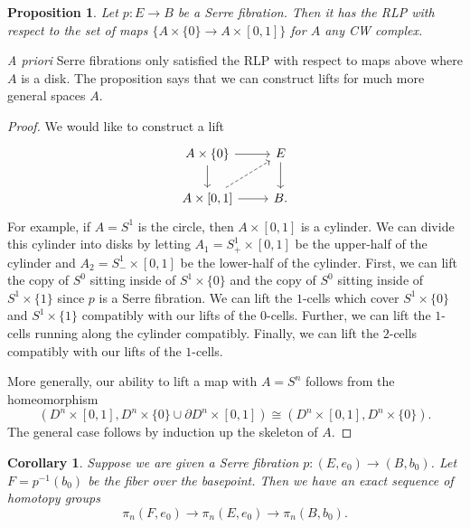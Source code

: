\documentclass{article}
\newtheorem{proposition}[theorem]{Proposition}
\newtheorem{corollary}[theorem]{Corollary}
\newtheorem{proposed work}[theorem]{Proposed Work}
\begin{document}
\begin{proposition}
Let $p : E \to B$ be a Serre fibration. Then it has the RLP with respect to the set of maps $\{A \times \{0\} \to A \times [0,1]\}$ for $A$ any CW complex. 
\end{proposition}

\emph{A priori} Serre fibrations only satisfied the RLP with respect to maps above where $A$ is a disk. The proposition says that we can construct lifts for much more general spaces $A$. 

\begin{proof}
We would like to construct a lift
\[
\begin{tikzcd}
A \times \{0 \} \arrow[r] \arrow[d] & E \arrow[d] \\
A \times [0,1] \arrow[r] \arrow[dashed,ur]  & B .
\end{tikzcd}
\]
For example, if $A = S^1$ is the circle, then $A \times [0,1]$ is a cylinder. We can divide this cylinder into disks by letting $A_1 = S^1_+ \times [0,1]$ be the upper-half of the cylinder and $A_2 = S^1_- \times [0,1]$ be the lower-half of the cylinder. First, we can lift the copy of $S^0$ sitting inside of $S^1 \times \{0\}$ and the copy of $S^0$ sitting inside of $S^1 \times \{1\}$ since $p$ is a Serre fibration. We can lift the $1$-cells which cover $S^1 \times \{0\}$ and $S^1 \times \{1\}$ compatibly with our lifts of the $0$-cells. Further, we can lift the $1$-cells running along the cylinder compatibly. Finally, we can lift the $2$-cells compatibly with our lifts of the $1$-cells. 

More generally, our ability to lift a map with $A = S^n$  follows from the homeomorphism
$$(D^n \times [0,1], D^n \times \{0\} \cup \partial D^n \times [0,1]) \cong (D^n \times [0,1], D^n \times \{0\}).$$
The general case follows by induction up the skeleton of $A$.  
\end{proof}

\begin{corollary}\label{sesfib}
Suppose we are given a Serre fibration $p : (E,e_0) \to (B,b_0)$. Let $F = p^{-1}(b_0)$ be the fiber over the basepoint. Then we have an exact sequence of homotopy groups
$$\pi_n(F,e_0) \to \pi_n(E,e_0) \to \pi_n(B,b_0).$$
\end{corollary}
\end{document}
